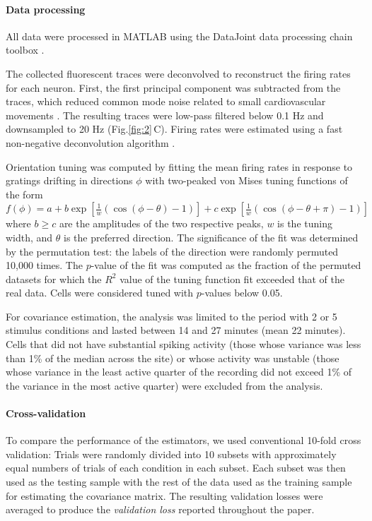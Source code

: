 \documentclass[10pt]{article}
\newcommand{\figref}[2]{Fig.\;\ref{fig:#1}\,#2}
\begin{document}
\paragraph{Data processing}
All data were processed in MATLAB using the DataJoint data processing chain toolbox \cite{DataJoint:2014}. 

The collected fluorescent traces were deconvolved to reconstruct the firing rates for each neuron. First, the first principal component was subtracted from the traces, which reduced common mode noise related to small cardiovascular movements \cite{Cotton:2013}. The resulting traces were low-pass filtered below 0.1 Hz and downsampled to 20 Hz (\figref{2}{C}). Firing rates were estimated using a fast non-negative deconvolution algorithm \cite{Vogelstein:2010}.

Orientation tuning was computed by fitting the mean firing rates in response to gratings drifting in directions $\phi$ with two-peaked von Mises tuning functions of the form $f(\phi)=a + b\exp\left[\frac 1 w(\cos(\phi-\theta)-1) \right] + c\exp\left[\frac 1 w(\cos(\phi-\theta+\pi)-1) \right]$ where $b\ge c$ are the amplitudes of the two respective peaks, $w$ is the tuning width, and  $\theta$ is the preferred direction. The significance of the fit was determined by the permutation test: the labels of the direction were randomly permuted 10,000 times.  The $p$-value of the fit was computed as the fraction of the permuted datasets for which the $R^2$ value of the tuning function fit exceeded that of the real data.  Cells were considered tuned with $p$-values below 0.05.

For covariance estimation, the analysis was limited to the period with 2 or 5 stimulus conditions and lasted between 14 and 27 minutes (mean 22 minutes).  Cells that did not have substantial spiking activity (those whose variance was less than 1\% of the median across the site) or whose activity was unstable (those whose variance in the least active quarter of the recording did not exceed 1\% of the variance in the most active quarter) were excluded from the analysis.

\paragraph{Cross-validation}
To compare the performance of the estimators, we used conventional 10-fold cross validation: Trials were randomly divided into 10 subsets with approximately equal numbers of trials of each condition in each subset. Each subset was then used as the testing sample with the rest of the data used as the training sample for estimating the covariance matrix. The resulting validation losses were averaged to produce the \emph{validation loss} reported throughout the paper.
\end{document}
